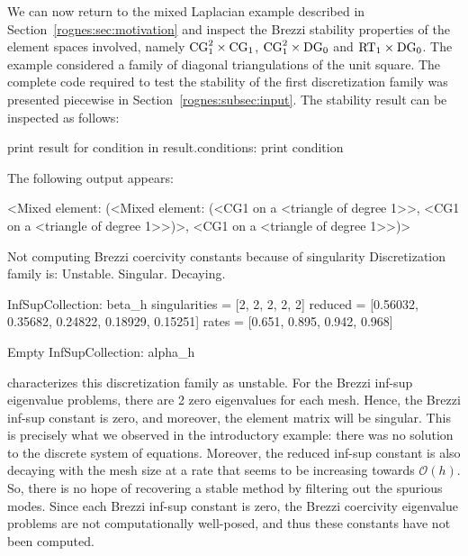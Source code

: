 We can now return to the mixed Laplacian example described in
Section~\ref{rognes:sec:motivation} and inspect the Brezzi stability
properties of the element spaces involved, namely
$\mathrm{CG}_1^2 \times \mathrm{CG}_1$, $\mathrm{CG}_1^2
\times \mathrm{DG}_0$ and $\mathrm{RT}_1 \times \mathrm{DG}_0$. The
example considered a family of diagonal triangulations of the unit
square. The complete code required to test the stability of the first
discretization family was presented piecewise in
Section~\ref{rognes:subsec:input}. The stability result can be
inspected as follows:
\begin{python}
print result
for condition in result.conditions:
    print condition
\end{python}
The following output appears:
\begin{python}
<Mixed element: (<Mixed element: (<CG1 on a <triangle of degree 1>>,
<CG1 on a <triangle of degree 1>>)>, <CG1 on a <triangle of degree 1>>)>

Not computing Brezzi coercivity constants because of singularity
Discretization family is: Unstable. Singular. Decaying.

InfSupCollection: beta_h
singularities =  [2, 2, 2, 2, 2]
reduced =        [0.56032, 0.35682, 0.24822, 0.18929, 0.15251]
rates  =         [0.651, 0.895, 0.942, 0.968]

Empty InfSupCollection: alpha_h
\end{python}
\rognesascot{} characterizes this discretization family as
unstable. For the Brezzi inf-sup eigenvalue problems, there are 2 zero
eigenvalues for each mesh. Hence, the Brezzi inf-sup constant is zero,
and moreover, the element matrix will be singular. This is precisely
what we observed in the introductory example: there was no solution to
the discrete system of equations. Moreover, the reduced inf-sup
constant is also decaying with the mesh size at a rate that seems to
be increasing towards $\mathcal{O}(h)$. So, there is no hope of
recovering a stable method by filtering out the spurious modes. Since
each Brezzi inf-sup constant is zero, the Brezzi coercivity eigenvalue
problems are not computationally well-posed, and thus these constants
have not been computed.

